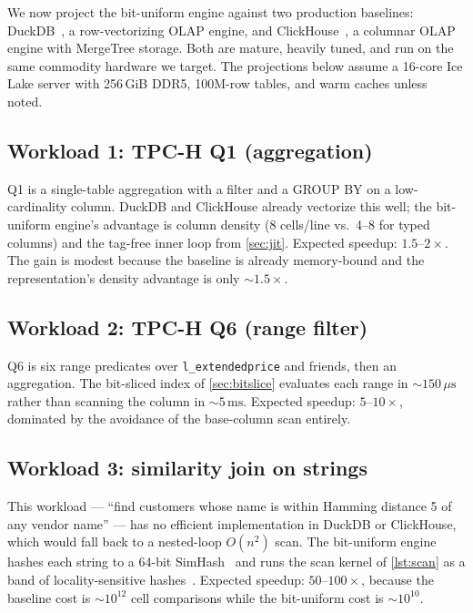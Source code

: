 \documentclass[10pt]{article}
\theoremstyle{definition}
\begin{document}
We now project the bit-uniform engine against two production baselines: DuckDB~\citep{duckdb}, a row-vectorizing OLAP engine, and ClickHouse~\citep{clickhouse}, a columnar OLAP engine with MergeTree storage. Both are mature, heavily tuned, and run on the same commodity hardware we target. The projections below assume a 16-core Ice Lake server with 256\,GiB DDR5, 100M-row tables, and warm caches unless noted.

\subsection{Workload 1: TPC-H Q1 (aggregation)}

Q1 is a single-table aggregation with a filter and a GROUP BY on a low-cardinality column. DuckDB and ClickHouse already vectorize this well; the bit-uniform engine's advantage is column density (8 cells/line vs.\ 4--8 for typed columns) and the tag-free inner loop from \cref{sec:jit}. Expected speedup: $1.5$--$2\times$. The gain is modest because the baseline is already memory-bound and the representation's density advantage is only $\sim\!1.5\times$.

\subsection{Workload 2: TPC-H Q6 (range filter)}

Q6 is six range predicates over \texttt{l\_extendedprice} and friends, then an aggregation. The bit-sliced index of \cref{sec:bitslice} evaluates each range in $\sim\!150\,\mu\text{s}$ rather than scanning the column in $\sim\!5\,\text{ms}$. Expected speedup: $5$--$10\times$, dominated by the avoidance of the base-column scan entirely.

\subsection{Workload 3: similarity join on strings}

This workload --- ``find customers whose name is within Hamming distance 5 of any vendor name'' --- has no efficient implementation in DuckDB or ClickHouse, which would fall back to a nested-loop $O(n^2)$ scan. The bit-uniform engine hashes each string to a 64-bit SimHash~\citep{byg_search} and runs the scan kernel of \cref{lst:scan} as a band of locality-sensitive hashes~\citep{andoni_indyk}. Expected speedup: $50$--$100\times$, because the baseline cost is $\sim\!10^{12}$ cell comparisons while the bit-uniform cost is $\sim\!10^{10}$.
\end{document}

